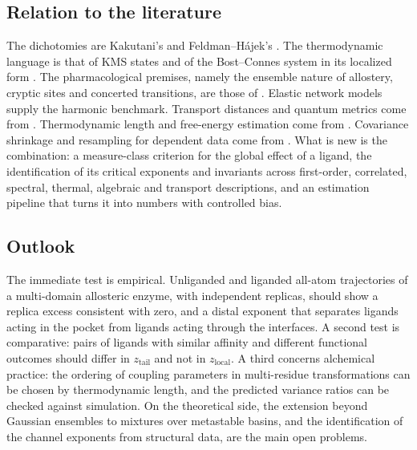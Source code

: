 \documentclass[11pt,reqno]{amsart}
\theoremstyle{plain}
\theoremstyle{definition}
\theoremstyle{remark}
\numberwithin{equation}{section}
\begin{document}
\subsection*{Relation to the literature}
The dichotomies are Kakutani's \cite{Kakutani1948} and Feldman--H\'ajek's \cite{Feldman1958,Hajek1958}. The thermodynamic language is that of KMS states \cite{HHW1967,BratteliRobinson1997} and of the Bost--Connes system \cite{BostConnes1995} in its localized form \cite{Chen2026}. The pharmacological premises, namely the ensemble nature of allostery, cryptic sites and concerted transitions, are those of \cite{Motlagh2014,Bowman2012,MWC1965}. Elastic network models \cite{Tirion1996,Atilgan2001} supply the harmonic benchmark. Transport distances and quantum metrics come from \cite{KantorovichRubinstein1958,Villani2009,Connes1989,Rieffel1999}. Thermodynamic length and free-energy estimation come from \cite{Crooks2007,SivakCrooks2012,Zwanzig1954,ShirtsChodera2008}. Covariance shrinkage and resampling for dependent data come from \cite{LedoitWolf2004,Kunsch1989,EfronTibshirani1993}. What is new is the combination: a measure-class criterion for the global effect of a ligand, the identification of its critical exponents and invariants across first-order, correlated, spectral, thermal, algebraic and transport descriptions, and an estimation pipeline that turns it into numbers with controlled bias.

\subsection*{Outlook}
The immediate test is empirical. Unliganded and liganded all-atom trajectories of a multi-domain allosteric enzyme, with independent replicas, should show a replica excess consistent with zero, and a distal exponent that separates ligands acting in the pocket from ligands acting through the interfaces. A second test is comparative: pairs of ligands with similar affinity and different functional outcomes should differ in $z_{\mathrm{tail}}$ and not in $z_{\mathrm{local}}$. A third concerns alchemical practice: the ordering of coupling parameters in multi-residue transformations can be chosen by thermodynamic length, and the predicted variance ratios can be checked against simulation. On the theoretical side, the extension beyond Gaussian ensembles to mixtures over metastable basins, and the identification of the channel exponents from structural data, are the main open problems.
\end{document}
